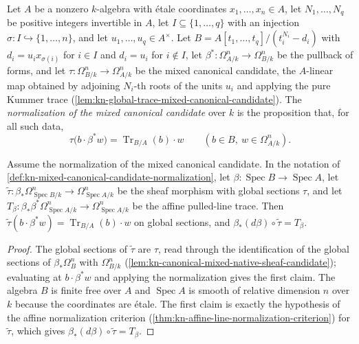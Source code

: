\begin{definition}
\label{def:kn-mixed-canonical-candidate-normalization}
\leanok
Let $A$ be a nonzero $k$-algebra with \'etale coordinates
$x_1,\dots,x_n\in A$, let $N_1,\dots,N_q$ be positive integers invertible in
$A$, let $I\subseteq\{1,\dots,q\}$ with an injection
$\sigma:I\hookrightarrow\{1,\dots,n\}$, and let $u_1,\dots,u_q\in A^\times$.
Let $B=A[t_1,\dots,t_q]/(t_i^{N_i}-d_i)$ with $d_i=u_ix_{\sigma(i)}$ for
$i\in I$ and $d_i=u_i$ for $i\notin I$, let $\beta^*:\Omega^n_{A/k}\to\Omega^n_{B/k}$
be the pullback of forms, and let $\tau:\Omega^n_{B/k}\to\Omega^n_{A/k}$ be the
mixed canonical candidate, the $A$-linear map obtained by adjoining
$N_i$-th roots of the units $u_i$ and applying the pure Kummer trace
(\cref{lem:kn-global-trace-mixed-canonical-candidate}). The
\emph{normalization of the mixed canonical candidate} over $k$ is the
proposition that, for all such data,
\[
 \tau\bigl(b\cdot\beta^*w\bigr)=\operatorname{Tr}_{B/A}(b)\cdot w
 \qquad(b\in B,\ w\in\Omega^n_{A/k}).
\]
\end{definition}

\begin{lemma}
\label{lem:kn-mixed-sheaf-candidate-differential}
\leanok
Assume the normalization of the mixed canonical candidate. In the notation of
\cref{def:kn-mixed-canonical-candidate-normalization}, let
$\beta:\operatorname{Spec}B\to\operatorname{Spec}A$, let
$\tilde\tau:\beta_*\Omega^n_{\operatorname{Spec}B/k}\to\Omega^n_{\operatorname{Spec}A/k}$
be the sheaf morphism with global sections $\tau$, and let
$T_\beta:\beta_*\beta^*\Omega^n_{\operatorname{Spec}A/k}\to\Omega^n_{\operatorname{Spec}A/k}$
be the affine pulled-line trace. Then $\tilde\tau(b\cdot\beta^*w)=\operatorname{Tr}_{B/A}(b)\cdot w$
on global sections, and $\beta_*(d\beta)\circ\tilde\tau=T_\beta$.
\end{lemma}
\begin{proof}
The global sections of $\tilde\tau$ are $\tau$, read through the identification
of the global sections of $\beta_*\Omega^n_B$ with $\Omega^n_{B/k}$
(\cref{lem:kn-canonical-mixed-native-sheaf-candidate}); evaluating at
$b\cdot\beta^*w$ and applying the normalization gives the first claim. The
algebra $B$ is finite free over $A$ and $\operatorname{Spec}A$ is smooth of
relative dimension $n$ over $k$ because the coordinates are \'etale. The first
claim is exactly the hypothesis of the affine normalization criterion
(\cref{thm:kn-affine-line-normalization-criterion}) for $\tilde\tau$, which gives
$\beta_*(d\beta)\circ\tilde\tau=T_\beta$.
\end{proof}

